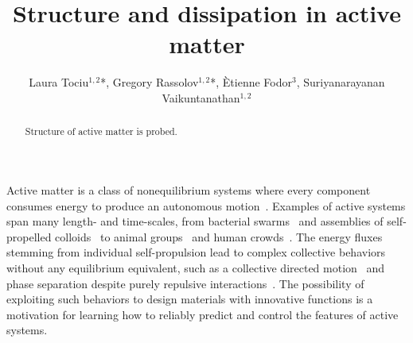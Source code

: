 \documentclass[amsmath,preprintnumbers,10pt,nofootinbib,prl,twocolumn]{revtex4-1}
\begin{document}
 
\title{Structure and dissipation in active matter}
\author{ Laura Tociu$^{1,2}$*, Gregory Rassolov$^{1,2}$*, \`Etienne Fodor$^{3}$, Suriyanarayanan Vaikuntanathan$^{1,2}$}
\begin{abstract}
Structure of active matter is probed.
\end{abstract}

\maketitle



Active matter is a class of nonequilibrium systems where every component consumes energy to produce an autonomous motion~\cite{Marchetti2013, Bechinger2016, Marchetti2018}. Examples of active systems span many length- and time-scales, from bacterial swarms~\cite{Libchaber2000, Elgeti2015} and assemblies of self-propelled colloids~\cite{Bechinger2013, Palacci2013} to animal groups~\cite{Cavagna2010, Cavagna2014} and human crowds~\cite{Bottinelli2016, Bartolo2019}. The energy fluxes stemming from individual self-propulsion lead to complex collective behaviors without any equilibrium equivalent, such as a collective directed motion~\cite{Dauchot2010, Sood2014} and phase separation despite purely repulsive interactions~\cite{Bechinger2013, Palacci2013}. The possibility of exploiting such behaviors to design materials with innovative functions is a motivation for learning how to reliably predict and control the features of active systems.
\end{document}
